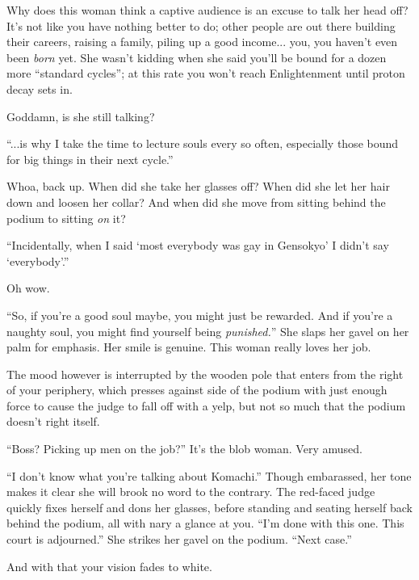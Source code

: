 \documentclass[a4paper,12pt]{book}
\begin{document}
Why does this woman think a captive audience is an excuse to talk her head off? It's not like you have nothing better to do; other people are out there building their careers, raising a family, piling up a good income... you, you haven't even been \emph{born} yet. She wasn't kidding when she said you'll be bound for a dozen more ``standard cycles''; at this rate you won't reach Enlightenment until proton decay sets in.

Goddamn, is she still talking?

``...is why I take the time to lecture souls every so often, especially those bound for big things in their next cycle.''

Whoa, back up. When did she take her glasses off? When did she let her hair down and loosen her collar? And when did she move from sitting behind the podium to sitting \emph{on} it?

``Incidentally, when I said `most everybody was gay in Gensokyo' I didn't say `everybody'.''

Oh wow.

``So, if you're a good soul maybe, you might just be rewarded. And if you're a naughty soul, you might find yourself being \emph{punished.}'' She slaps her gavel on her palm for emphasis. Her smile is genuine. This woman really loves her job.

The mood however is interrupted by the wooden pole that enters from the right of your periphery, which presses against side of the podium with just enough force to cause the judge to fall off with a yelp, but not so much that the podium doesn't right itself.

``Boss? Picking up men on the job?'' It's the blob woman. Very amused.

``I don't know what you're talking about Komachi.'' Though embarassed, her tone makes it clear she will brook no word to the contrary. The red-faced judge quickly fixes herself and dons her glasses, before standing and seating herself back behind the podium, all with nary a glance at you. ``I'm done with this one. This court is adjourned.'' She strikes her gavel on the podium. ``Next case.''

And with that your vision fades to white.
\end{document}
